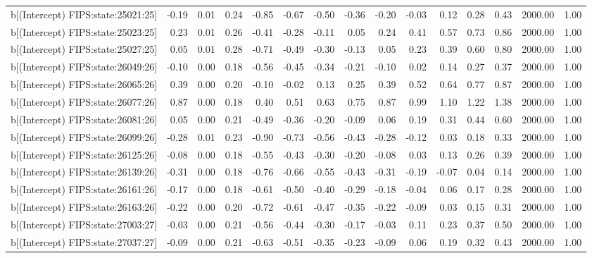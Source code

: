 \begin{table}[ht]
\begin{tabular}{rrrrrrrrrrrrrrr}
  b[(Intercept) FIPS:state:25021:25] & -0.19 & 0.01 & 0.24 & -0.85 & -0.67 & -0.50 & -0.36 & -0.20 & -0.03 & 0.12 & 0.28 & 0.43 & 2000.00 & 1.00 \\ 
  b[(Intercept) FIPS:state:25023:25] & 0.23 & 0.01 & 0.26 & -0.41 & -0.28 & -0.11 & 0.05 & 0.24 & 0.41 & 0.57 & 0.73 & 0.86 & 2000.00 & 1.00 \\ 
  b[(Intercept) FIPS:state:25027:25] & 0.05 & 0.01 & 0.28 & -0.71 & -0.49 & -0.30 & -0.13 & 0.05 & 0.23 & 0.39 & 0.60 & 0.80 & 2000.00 & 1.00 \\ 
  b[(Intercept) FIPS:state:26049:26] & -0.10 & 0.00 & 0.18 & -0.56 & -0.45 & -0.34 & -0.21 & -0.10 & 0.02 & 0.14 & 0.27 & 0.37 & 2000.00 & 1.00 \\ 
  b[(Intercept) FIPS:state:26065:26] & 0.39 & 0.00 & 0.20 & -0.10 & -0.02 & 0.13 & 0.25 & 0.39 & 0.52 & 0.64 & 0.77 & 0.87 & 2000.00 & 1.00 \\ 
  b[(Intercept) FIPS:state:26077:26] & 0.87 & 0.00 & 0.18 & 0.40 & 0.51 & 0.63 & 0.75 & 0.87 & 0.99 & 1.10 & 1.22 & 1.38 & 2000.00 & 1.00 \\ 
  b[(Intercept) FIPS:state:26081:26] & 0.05 & 0.00 & 0.21 & -0.49 & -0.36 & -0.20 & -0.09 & 0.06 & 0.19 & 0.31 & 0.44 & 0.60 & 2000.00 & 1.00 \\ 
  b[(Intercept) FIPS:state:26099:26] & -0.28 & 0.01 & 0.23 & -0.90 & -0.73 & -0.56 & -0.43 & -0.28 & -0.12 & 0.03 & 0.18 & 0.33 & 2000.00 & 1.00 \\ 
  b[(Intercept) FIPS:state:26125:26] & -0.08 & 0.00 & 0.18 & -0.55 & -0.43 & -0.30 & -0.20 & -0.08 & 0.03 & 0.13 & 0.26 & 0.39 & 2000.00 & 1.00 \\ 
  b[(Intercept) FIPS:state:26139:26] & -0.31 & 0.00 & 0.18 & -0.76 & -0.66 & -0.55 & -0.43 & -0.31 & -0.19 & -0.07 & 0.04 & 0.14 & 2000.00 & 1.00 \\ 
  b[(Intercept) FIPS:state:26161:26] & -0.17 & 0.00 & 0.18 & -0.61 & -0.50 & -0.40 & -0.29 & -0.18 & -0.04 & 0.06 & 0.17 & 0.28 & 2000.00 & 1.00 \\ 
  b[(Intercept) FIPS:state:26163:26] & -0.22 & 0.00 & 0.20 & -0.72 & -0.61 & -0.47 & -0.35 & -0.22 & -0.09 & 0.03 & 0.15 & 0.31 & 2000.00 & 1.00 \\ 
  b[(Intercept) FIPS:state:27003:27] & -0.03 & 0.00 & 0.21 & -0.56 & -0.44 & -0.30 & -0.17 & -0.03 & 0.11 & 0.23 & 0.37 & 0.50 & 2000.00 & 1.00 \\ 
  b[(Intercept) FIPS:state:27037:27] & -0.09 & 0.00 & 0.21 & -0.63 & -0.51 & -0.35 & -0.23 & -0.09 & 0.06 & 0.19 & 0.32 & 0.43 & 2000.00 & 1.00 \\ 

\end{tabular}
\end{table}
